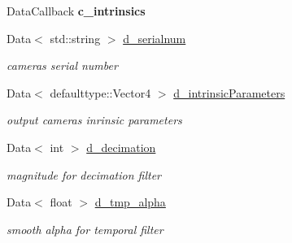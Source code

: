 \begin{DoxyCompactItemize}
\mbox{\label{classsofa_1_1rgbdtracking_1_1_real_sense_streamer_a22b457cc55e1b6c1b0ce649c27c20ee6}} 
Data\+Callback {\bfseries c\+\_\+intrinsics}
\item 
\mbox{\label{classsofa_1_1rgbdtracking_1_1_real_sense_streamer_a92280208940462e9022c7f62e0717ba6}} 
Data$<$ std\+::string $>$ \hyperlink{classsofa_1_1rgbdtracking_1_1_real_sense_streamer_a92280208940462e9022c7f62e0717ba6}{d\+\_\+serialnum}
\begin{DoxyCompactList}\small\item\em camera\textquotesingle{}s serial number \end{DoxyCompactList}\item 
\mbox{\label{classsofa_1_1rgbdtracking_1_1_real_sense_streamer_ac7bf922ca7ebd7333ad59e4e46cd956c}} 
Data$<$ defaulttype\+::\+Vector4 $>$ \hyperlink{classsofa_1_1rgbdtracking_1_1_real_sense_streamer_ac7bf922ca7ebd7333ad59e4e46cd956c}{d\+\_\+intrinsic\+Parameters}
\begin{DoxyCompactList}\small\item\em output camera\textquotesingle{}s inrinsic parameters \end{DoxyCompactList}\item 
\mbox{\label{classsofa_1_1rgbdtracking_1_1_real_sense_streamer_a9a2ee35697a6b660e31c60bee13382f5}} 
Data$<$ int $>$ \hyperlink{classsofa_1_1rgbdtracking_1_1_real_sense_streamer_a9a2ee35697a6b660e31c60bee13382f5}{d\+\_\+decimation}
\begin{DoxyCompactList}\small\item\em magnitude for decimation filter \end{DoxyCompactList}\item 
\mbox{\label{classsofa_1_1rgbdtracking_1_1_real_sense_streamer_a3c990ea526b262dd9bfff7e0245ac443}} 
Data$<$ float $>$ \hyperlink{classsofa_1_1rgbdtracking_1_1_real_sense_streamer_a3c990ea526b262dd9bfff7e0245ac443}{d\+\_\+tmp\+\_\+alpha}
\begin{DoxyCompactList}\small\item\em smooth alpha for temporal filter \end{DoxyCompactList}\item 

\end{DoxyCompactItemize}
